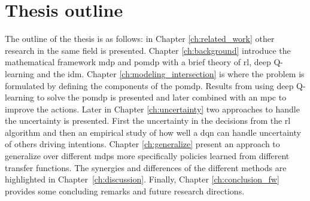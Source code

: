 \section{Thesis outline}
The outline of the thesis is as follows: in Chapter \ref{ch:related_work} other research in the same field is presented. Chapter \ref{ch:background} introduce the mathematical framework \gls{mdp} and \gls{pomdp} with a brief theory of \gls{rl}, deep Q-learning and the \gls{idm}. 
Chapter \ref{ch:modeling_intersection} is where the problem is formulated by defining the components of the \gls{pomdp}. Results from using deep Q-learning to solve the \gls{pomdp} is presented and later combined with an \gls{mpc} to improve the actions. Later in Chapter \ref{ch:uncertainty} two approaches to handle the uncertainty is presented. First the uncertainty in the decisions from the \gls{rl} algorithm and then an empirical study of how well a \gls{dqn} can handle uncertainty of others driving intentions. Chapter \ref{ch:generalize} present an approach to generalize over different \gls{mdp}s more specifically policies learned from different transfer functions. The synergies and differences of the different methods are highlighted in Chapter~\ref{ch:discussion}. Finally, Chapter \ref{ch:conclusion_fw} provides some concluding remarks and future research directions. 

